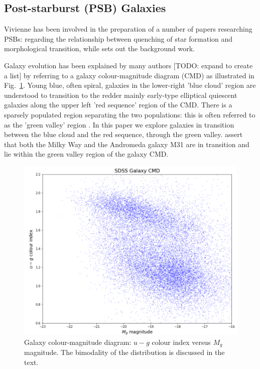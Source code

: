 \subsection{Post-starburst (PSB) Galaxies}
\label{sec:PSBs}
Vivienne has been involved in the preparation of a number of papers researching PSBs: \citet{2017MNRAS.472.1401A} regarding the relationship between quenching of star formation and morphological transition, while \citet{2016MNRAS.463..832W} sets out the background work.
\par Galaxy evolution has been explained by many authors [TODO: expand to create a list] \citep{baldry2004quantifying,2006MNRAS.373..469B} by referring to a galaxy colour-magnitude diagram (CMD) as illustrated in Fig.~\ref{fig:CMD1}. Young blue, often spiral, galaxies in the lower-right 'blue cloud' region are understood to transition to the redder mainly early-type elliptical quiescent galaxies along the upper left 'red sequence' region of the CMD. There is a sparsely populated region separating the two populations: this is often referred to as the 'green valley' region \citep{2004ApJ...608..752B}. In this paper we explore galaxies in transition between the blue cloud and the red sequence, through the green valley.
\citet{Mutch_2011} assert that both the Milky Way and the Andromeda galaxy M31 are in transition and lie within the green valley region of the galaxy CMD.

\begin{figure}
	\includegraphics[width=\columnwidth]{images/CMDs/galaxyCMD.PNG}
    \caption{Galaxy colour-magnitude diagram: $u-g$ colour index versus $M_g$ magnitude. The bimodality of the distribution is discussed in the text.}
    \label{fig:CMD1}
\end{figure}